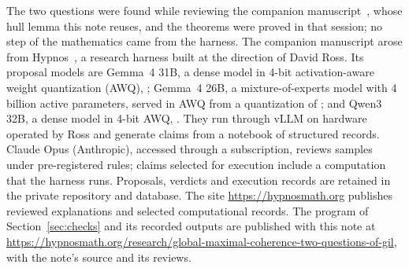 \documentclass[11pt]{article}
\begin{document}
The two questions were found while reviewing the companion manuscript~\cite{ross}, whose hull
lemma this note reuses, and the theorems were proved in that session; no step of the mathematics
came from the harness. The companion manuscript arose from Hypnos~\cite{HypnosMethods}, a research harness built at the direction of David Ross. Its proposal models are Gemma~4 31B, a dense model in 4-bit activation-aware weight quantization (AWQ), ; Gemma~4 26B, a mixture-of-experts model with 4 billion active parameters, served in AWQ from a quantization of ; and Qwen3 32B, a dense model in 4-bit AWQ, . They run through vLLM on hardware operated by Ross and generate claims from a notebook of structured records. Claude Opus (Anthropic), accessed through a subscription, reviews samples under pre-registered rules; claims selected for execution include a computation that the harness runs. Proposals, verdicts and execution records are retained in the private repository and database. The site \url{https://hypnosmath.org} publishes reviewed explanations and selected computational records. The program of Section~\ref{sec:checks} and its
recorded outputs are published with this note at
\url{https://hypnosmath.org/research/global-maximal-coherence-two-questions-of-gil}, with the
note's source and its reviews.
\end{document}
